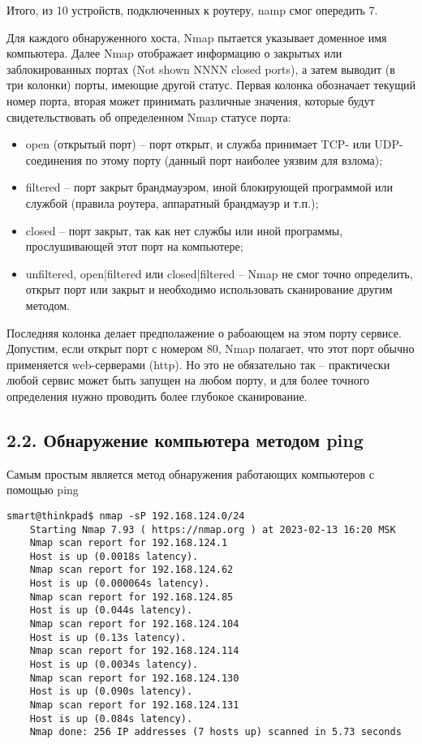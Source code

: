 Итого, из 10 устройств, подключенных к роутеру, namp смог опередить 7.

Для каждого обнаруженного хоста, Nmap пытается указывает доменное имя компьютера. Далее Nmap отображает информацию о закрытых или заблокированных портах (Not shown NNNN closed ports), а затем выводит (в три колонки) порты, имеющие другой статус. Первая колонка обозначает текущий номер порта, вторая может принимать различные значения, которые будут свидетельствовать об определенном Nmap статусе порта:

\begin{itemize}
    \item open (открытый порт) -- порт открыт, и служба принимает TCP- или UDP-соединения по этому порту (данный порт наиболее уязвим для взлома);
    \item filtered -- порт закрыт брандмауэром, иной блокирующей программой или службой (правила роутера, аппаратный брандмауэр и т.п.);
    \item closed -- порт закрыт, так как нет службы или иной программы, прослушивающей этот порт на компьютере;
    \item unfiltered, open|filtered или closed|filtered -- Nmap не смог точно определить, открыт порт или закрыт и необходимо использовать сканирование другим методом.
\end{itemize}

Последняя колонка делает предполажение о рабоающем на этом порту сервисе. Допустим, если открыт порт с номером 80, Nmap полагает, что этот порт обычно применяется web-серверами (http). Но это не обязательно так -- практически любой сервис может быть запущен на любом порту, и для более точного определения нужно проводить более глубокое сканирование.

\subsection*{2.2. Обнаружение компьютера методом ping}

Самым простым является метод обнаружения работающих компьютеров с помощью ping
\begin{Verbatim}[frame=single]
    smart@thinkpad$ nmap -sP 192.168.124.0/24
    Starting Nmap 7.93 ( https://nmap.org ) at 2023-02-13 16:20 MSK
    Nmap scan report for 192.168.124.1
    Host is up (0.0018s latency).
    Nmap scan report for 192.168.124.62
    Host is up (0.000064s latency).
    Nmap scan report for 192.168.124.85
    Host is up (0.044s latency).
    Nmap scan report for 192.168.124.104
    Host is up (0.13s latency).
    Nmap scan report for 192.168.124.114
    Host is up (0.0034s latency).
    Nmap scan report for 192.168.124.130
    Host is up (0.090s latency).
    Nmap scan report for 192.168.124.131
    Host is up (0.084s latency).
    Nmap done: 256 IP addresses (7 hosts up) scanned in 5.73 seconds
\end{Verbatim}

